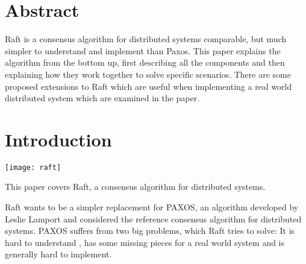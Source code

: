 




\begin{titlepage}
\afterpage{\restorepagecolor}
\newcommand{\colorRule}[3][black]{\textcolor[HTML]{#1}{\rule{#2}{#3}}}
\end{titlepage}
\restoregeometry



{
\hypersetup{linkcolor=}
\setcounter{tocdepth}{3}
\tableofcontents
\pagebreak
}

\section{Abstract}

Raft is a consensus algorithm for distributed systems comparable, but much simpler to understand and implement than Paxos.
This paper explains the algorithm from the bottom up, first describing all the components and
then explaining how they work together to solve specific scenarios.
There are some proposed extensions to Raft which are useful when implementing a real world distributed system which are examined in the paper.

\section{Introduction}

\texttt{[image: raft]}

This paper covers Raft, a consensus algorithm for distributed systems.

Raft wants to be a simpler replacement for PAXOS, an algorithm developed by Leslie Lamport and considered the reference consensus algorithm for distributed systems\cite{paxos}. PAXOS suffers from two big problems, which Raft tries to solve: It is hard to understand \cite[p.91]{raft_phd_thesis}, has some missing pieces for a real world system and is generally hard to implement\cite{paxos_made_live}.

